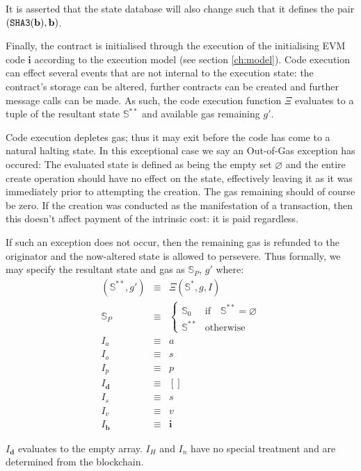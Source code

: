 \documentclass[9pt,oneside]{amsart}
\begin{document}
\begin{multicols}{2}
It is asserted that the state database will also change such that it defines the pair $(\mathtt{\tiny SHA3}(\mathbf{b}), \mathbf{b})$.

Finally, the contract is initialised through the execution of the initialising EVM code $\mathbf{i}$ according to the execution model (see section \ref{ch:model}). Code execution can effect several events that are not internal to the execution state: the contract's storage can be altered, further contracts can be created and further message calls can be made. As such, the code execution function $\Xi$ evaluates to a tuple of the resultant state $\mathbb{S}^{**}$ and available gas remaining $g'$.

Code execution depletes gas; thus it may exit before the code has come to a natural halting state. In this exceptional case we say an Out-of-Gas exception has occured: The evaluated state is defined as being the empty set $\varnothing$ and the entire create operation should have no effect on the state, effectively leaving it as it was immediately prior to attempting the creation. The gas remaining should of course be zero. If the creation was conducted as the manifestation of a transaction, then this doesn't affect payment of the intrinsic cost: it is paid regardless.

If such an exception does not occur, then the remaining gas is refunded to the originator and the now-altered state is allowed to persevere. Thus formally, we may specify the resultant state and gas as $\mathbb{S}_P$, $g'$ where:
\begin{eqnarray}
(\mathbb{S}^{**}, g') & \equiv & \Xi(\mathbb{S}^*, g, I) \\
\mathbb{S}_P & \equiv & \begin{cases}
\mathbb{S}_0 & \text{if} \quad \mathbb{S}^{**} = \varnothing \\
\mathbb{S}^{**} & \text{otherwise}
\end{cases} \\
I_a & \equiv & a \\
I_o & \equiv & s \\
I_p & \equiv & p \\
I_\mathbf{d} & \equiv & [] \\
I_s & \equiv & s \\
I_v & \equiv & v \\
I_\mathbf{b} & \equiv & \mathbf{i}
\end{eqnarray}

$I_\mathbf{d}$ evaluates to the empty array. $I_H$ and $I_n$ have no special treatment and are determined from the blockchain.


\end{multicols}
\end{document}
